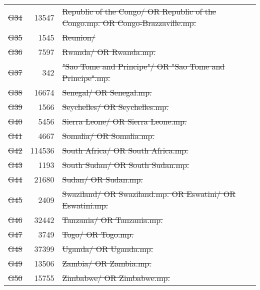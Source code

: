 \begin{longtable}{lrl}
  \st{G34} &  \num{13547} & \st{Republic of the Congo/ OR Republic of the Congo.mp. OR Congo-Brazzaville.mp.}         \\
  \st{G35} &   \num{1545} & \st{Reunion/}                                                                             \\
  \st{G36} &   \num{7597} & \st{Rwanda/ OR Rwanda.mp.}                                                                \\
  \st{G37} &    \num{342} & \st{"Sao Tome and Principe"/ OR "Sao Tome and Principe".mp.}                              \\
  \st{G38} &  \num{16674} & \st{Senegal/ OR Senegal.mp.}                                                              \\
  \st{G39} &   \num{1566} & \st{Seychelles/ OR Seychelles.mp.}                                                        \\
  \st{G40} &   \num{5456} & \st{Sierra Leone/ OR Sierra Leone.mp.}                                                    \\
  \st{G41} &   \num{4667} & \st{Somalia/ OR Somalia.mp.}                                                              \\
  \st{G42} & \num{114536} & \st{South Africa/ OR South Africa.mp.}                                                    \\
  \st{G43} &   \num{1193} & \st{South Sudan/ OR South Sudan.mp.}                                                      \\
  \st{G44} &  \num{21680} & \st{Sudan/ OR Sudan.mp.}                                                                  \\
  \st{G45} &   \num{2409} & \st{Swaziland/ OR Swaziland.mp. OR Eswatini/ OR Eswatini.mp.}                             \\
  \st{G46} &  \num{32442} & \st{Tanzania/ OR Tanzania.mp.}                                                            \\
  \st{G47} &   \num{3749} & \st{Togo/ OR Togo.mp.}                                                                    \\
  \st{G48} &  \num{37399} & \st{Uganda/ OR Uganda.mp.}                                                                \\
  \st{G49} &  \num{13506} & \st{Zambia/ OR Zambia.mp.}                                                                \\
  \st{G50} &  \num{15755} & \st{Zimbabwe/ OR Zimbabwe.mp.}                                                            \\

\end{longtable}

